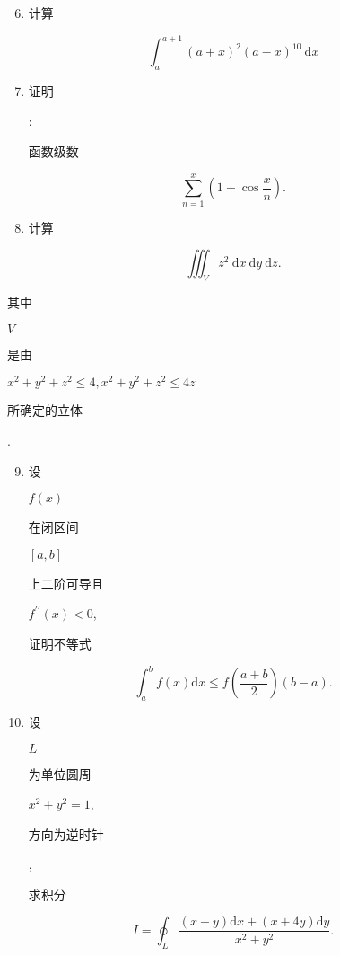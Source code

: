 \documentclass[10pt]{article}
\begin{document}
\begin{enumerate}
  \setcounter{enumi}{5}
  \item \begin{CJK}{UTF8}{mj}计算\end{CJK}
\end{enumerate}
$$
\int_{a}^{a+1}(a+x)^{2}(a-x)^{10} \mathrm{~d} x
$$

\begin{enumerate}
  \setcounter{enumi}{6}
  \item \begin{CJK}{UTF8}{mj}证明\end{CJK}: \begin{CJK}{UTF8}{mj}函数级数\end{CJK}
\end{enumerate}
$$
\sum_{n=1}^{x}\left(1-\cos \frac{x}{n}\right) .
$$

\begin{enumerate}
  \setcounter{enumi}{7}
  \item \begin{CJK}{UTF8}{mj}计算\end{CJK}
\end{enumerate}
$$
\iiint_{V} z^{2} \mathrm{~d} x \mathrm{~d} y \mathrm{~d} z .
$$
\begin{CJK}{UTF8}{mj}其中\end{CJK} $V$ \begin{CJK}{UTF8}{mj}是由\end{CJK} $x^{2}+y^{2}+z^{2} \leq 4, x^{2}+y^{2}+z^{2} \leq 4 z$ \begin{CJK}{UTF8}{mj}所确定的立体\end{CJK}.

\begin{enumerate}
  \setcounter{enumi}{8}
  \item \begin{CJK}{UTF8}{mj}设\end{CJK} $f(x)$ \begin{CJK}{UTF8}{mj}在闭区间\end{CJK} $[a, b]$ \begin{CJK}{UTF8}{mj}上二阶可导且\end{CJK} $f^{\prime \prime}(x)<0$, \begin{CJK}{UTF8}{mj}证明不等式\end{CJK}
\end{enumerate}
$$
\int_{a}^{b} f(x) \mathrm{d} x \leq f\left(\frac{a+b}{2}\right)(b-a) .
$$

\begin{enumerate}
  \setcounter{enumi}{9}
  \item \begin{CJK}{UTF8}{mj}设\end{CJK} $L$ \begin{CJK}{UTF8}{mj}为单位圆周\end{CJK} $x^{2}+y^{2}=1$, \begin{CJK}{UTF8}{mj}方向为逆时针\end{CJK}, \begin{CJK}{UTF8}{mj}求积分\end{CJK}
\end{enumerate}
$$
I=\oint_{L} \frac{(x-y) \mathrm{d} x+(x+4 y) \mathrm{d} y}{x^{2}+y^{2}} .
$$
\end{document}
